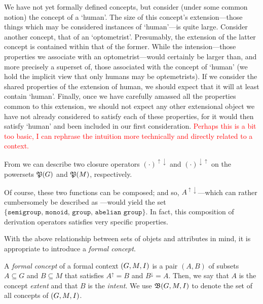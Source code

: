 We have not yet formally defined concepts, but consider (under some common notion) the concept of a `human'. The size of this concept's extension---those things which may be considered instances of `human'---is quite large. Consider another concept, that of an `optometrist'. Presumably, the extension of the latter concept is contained within that of the former. While the intension---those properties we associate with an optometrist---would certainly be larger than, and more precisely a superset of, those associated with the concept of `human' (we hold the implicit view that only humans may be optemetrists). If we consider the shared properties of the extension of human, we should expect that it will at least contain `human'. Finally, once we have carefully amassed all the properties common to this extension, we should not expect any other extensional object we have not already considered to satisfy each of these properties, for it would then satisfy `human' and been included in our first consideration. \textcolor{red}{Perhaps this is a bit too basic, I can rephrase the intuition more technically and directly related to a context.}



From  we can describe two closure operators $(\cdot)^{\uparrow \downarrow}$ and $(\cdot)^{\downarrow \uparrow}$ on the powersets $\mathfrak{P}({G})$ and $\mathfrak{P}({M})$, respectively.



Of course, these two functions can be composed; and so, $A^{\uparrow \downarrow}$---which can rather cumbersomely be described as ---would yield the set $\{\texttt{semigroup, monoid, group, abelian group}\}$. In fact, this composition of derivation operators satisfies very specific properties.%

With the above relationship between sets of objets and attributes in mind, it is appropriate to introduce a \textit{formal concept}.

\begin{definition}
  \label{definition:formal-concept} 
  A \textit{formal concept} of a formal context $(G,M,\mathrel{I})$  is a pair $(A,B)$ of subsets $A \subseteq G$ and $B \subseteq M$ that satisfies $A^\uparrow = B$ and $B^\downarrow = A$. Then, we say that $A$ is the concept \textit{extent} and that $B$ is the \textit{intent}. We use ${\mathfrak B} (G,M,\mathrel{I})$ to denote the set of all concepts of $(G,M,\mathrel{I})$.
\end{definition}

